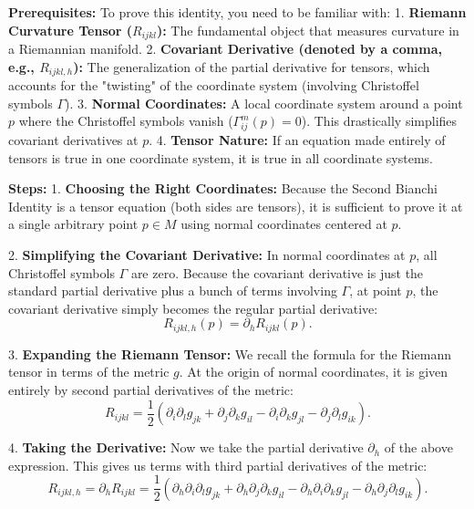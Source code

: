 \begin{solution}
\textbf{Prerequisites:}
To prove this identity, you need to be familiar with:
1. \textbf{Riemann Curvature Tensor ($R_{ijkl}$):} The fundamental object that measures curvature in a Riemannian manifold.
2. \textbf{Covariant Derivative (denoted by a comma, e.g., $R_{ijkl,h}$):} The generalization of the partial derivative for tensors, which accounts for the "twisting" of the coordinate system (involving Christoffel symbols $\Gamma$).
3. \textbf{Normal Coordinates:} A local coordinate system around a point $p$ where the Christoffel symbols vanish ($\Gamma^m_{ij}(p) = 0$). This drastically simplifies covariant derivatives at $p$.
4. \textbf{Tensor Nature:} If an equation made entirely of tensors is true in one coordinate system, it is true in all coordinate systems.
\par\vspace{\baselineskip}

\textbf{Steps:}
1. \textbf{Choosing the Right Coordinates:}
Because the Second Bianchi Identity is a tensor equation (both sides are tensors), it is sufficient to prove it at a single arbitrary point $p \in M$ using normal coordinates centered at $p$.
\par\vspace{\baselineskip}

2. \textbf{Simplifying the Covariant Derivative:}
In normal coordinates at $p$, all Christoffel symbols $\Gamma$ are zero. Because the covariant derivative is just the standard partial derivative plus a bunch of terms involving $\Gamma$, at point $p$, the covariant derivative simply becomes the regular partial derivative:
\[ R_{ijkl,h}(p) = \partial_h R_{ijkl}(p). \]
\par\vspace{\baselineskip}

3. \textbf{Expanding the Riemann Tensor:}
We recall the formula for the Riemann tensor in terms of the metric $g$. At the origin of normal coordinates, it is given entirely by second partial derivatives of the metric:
\[ R_{ijkl} = \frac{1}{2} (\partial_i \partial_l g_{jk} + \partial_j \partial_k g_{il} - \partial_i \partial_k g_{jl} - \partial_j \partial_l g_{ik}). \]
\par\vspace{\baselineskip}

4. \textbf{Taking the Derivative:}
Now we take the partial derivative $\partial_h$ of the above expression. This gives us terms with third partial derivatives of the metric:
\[ R_{ijkl,h} = \partial_h R_{ijkl} = \frac{1}{2} (\partial_h \partial_i \partial_l g_{jk} + \partial_h \partial_j \partial_k g_{il} - \partial_h \partial_i \partial_k g_{jl} - \partial_h \partial_j \partial_l g_{ik}). \]
\par\vspace{\baselineskip}


\end{solution}
